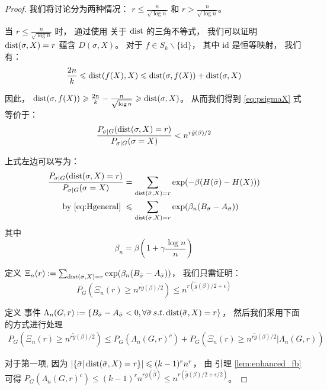 \begin{proof}
  我们将讨论分为两种情况： $r\leq \frac{n}{\sqrt{\log n}}$
  和 $r > \frac{n}{\sqrt{\log n}}$。
  
  当 $r\leq \frac{n}{\sqrt{\log n}}$ 时，
  通过使用 关于 $\operatorname{dist}$
  的三角不等式，
  我们可以证明 
  $\operatorname{dist}(\sigma, X) = r$ 蕴含
  $D(\sigma, X)$。
   对于 $f \in S_k \backslash \{ \textrm{id} \}$，
   其中
   $\textrm{id}$ 是恒等映射，
   我们有：
  $$
  \frac{2n}{k} \leqslant \operatorname{dist}(f(X), X) \leqslant \operatorname{dist}(\sigma, f(X)) + \operatorname{dist}(\sigma, X)
  $$
  
  因此，
  $\operatorname{dist}(\sigma, f(X)) \geqslant \frac{2n}{k} - \frac{n}{\sqrt{\log n}} \geqslant \operatorname{dist}(\sigma, X)$。
  从而我们得到
  \eqref{eq:psigmaX} 式 等价于：
  \begin{equation}\label{eq:psigmaX2}
  \frac{P_{\sigma|G}(\operatorname{dist}(\sigma, X)=r)}
  {P_{\sigma|G}(\sigma=X)} <
  n^{r \tilde{g}(\beta) /2}
  \end{equation}
  
  上式左边可以写为：
  \begin{align*}
  \frac{P_{\sigma|G}(\Dist(\sigma, X)=r)}
  {P_{\sigma|G}(\sigma=X)}  &= \sum_{\Dist(\bar{\sigma}, X)=r}\exp(-\beta(H(\bar{\sigma})-H(X)))\\
  \textrm{ by \eqref{eq:Hgeneral} } &\leq \sum_{\Dist(\bar{\sigma}, X)=r}\exp(\beta_n(B_{\bar{\sigma}}-A_{\bar{\sigma}}))
  \end{align*}
  其中 
  \begin{equation}\label{eq:beta_n_def}
  \beta_n = \beta(1+\gamma\frac{\log n}{n})
  \end{equation}
  
  定义
  $\Xi_n(r): = \sum_{\operatorname{dist}(\bar{\sigma}, X)=r}\exp(\beta_n(B_{\bar{\sigma}}-A_{\bar{\sigma}}))$，
  我们只需证明：
  \begin{equation}
  P_{G}(\Xi_n(r) \geq n^{r \tilde{g}(\beta) /2}) \leq  n^{r (\tilde{g}(\beta) /2 + \epsilon)}
  \end{equation}
  
  定义 事件 $\Lambda_n(G,r):=\{B_{\bar{\sigma}} -A_{\bar{\sigma}} < 0, \forall \bar{\sigma}\, s.t. \operatorname{dist}(\bar{\sigma}, X)=r\}$，
  然后我们采用下面的方式进行处理
  \begin{align*}
  P_{G}(\Xi_n(r) \geq n^{r \tilde{g}(\beta) /2}) \leq
  P_G(\Lambda_n(G,r)^c)
  + P_G\left(
    \Xi_n(r) \geq n^{r \tilde{g}(\beta) /2} |\Lambda_n(G,r) 
    \right)
  \end{align*}
  
  对于第一项, 因为
  $|\{ \bar{\sigma} | \operatorname{dist}(\bar{\sigma}, X) = r \}| \leqslant (k-1)^r n^r$，
  由 引理 \ref{lem:enhanced_fb}  可得
  $P_G(\Lambda_n(G,r)^c) \leq (k-1)^r n^{rg(\bar{\beta})} \leq n^{r (\tilde{g}(\beta) /2 + \epsilon/2)}$。


\end{proof}
